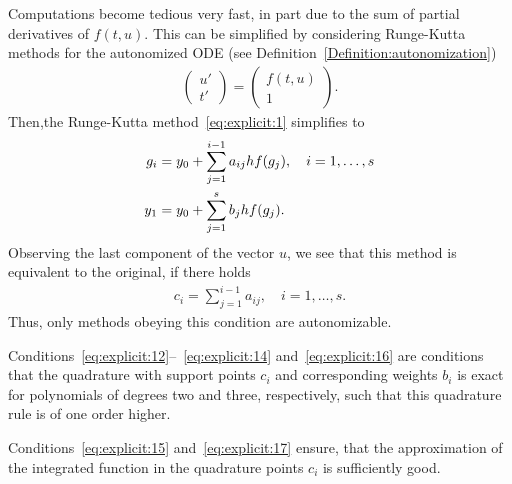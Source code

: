 \begin{remark}
  Computations become tedious very fast, in part due to the sum of
  partial derivatives of $f(t,u)$. This can be simplified by
  considering Runge-Kutta methods for the autonomized ODE (see
  Definition~\ref{Definition:autonomization})
  \begin{gather*}
    \begin{pmatrix} u' \\ t' \end{pmatrix} = 
    \begin{pmatrix} f(t,u) \\ 1 \end{pmatrix}.
  \end{gather*}
  Then,the Runge-Kutta method~\eqref{eq:explicit:1} simplifies to
  \begin{gather}
    \label{eq:explicit:7a}
    \begin{split}
      g_i &= y_0 +
      \sum_{j=1}^{i-1} a_{ij} h f(g_j),\quad i=1,\dots,s
      \\
      y_1 &= y_0 + \sum_{j=1}^s b_j h f(g_j).
    \end{split}
  \end{gather}
  Observing the last component of the vector $u$, we see that this
  method is equivalent to the original, if there holds
  \begin{gather}
    \label{eq:explicit:9}
    c_i = \sum_{j=1}^{i-1} a_{ij}, \quad i=1,\dots,s.
  \end{gather}
  Thus, only methods obeying this condition are autonomizable.
\end{remark}


\begin{remark}
  Conditions~\eqref{eq:explicit:12}--~\eqref{eq:explicit:14}
  and~\eqref{eq:explicit:16} are conditions that the quadrature with
  support points $c_i$ and corresponding weights $b_i$ is exact for
  polynomials of degrees two and three, respectively, such that this
  quadrature rule is of one order higher.

  Conditions~\eqref{eq:explicit:15} and~\eqref{eq:explicit:17} ensure,
  that the approximation of the integrated function in the quadrature
  points $c_i$ is sufficiently good.
\end{remark}

